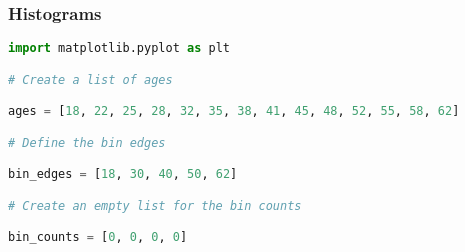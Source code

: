 \documentclass{beamer}
\begin{document}
    \begin{frame}[fragile]
    \frametitle{Histograms}
    \begin{lstlisting}[language=Python]
import matplotlib.pyplot as plt

# Create a list of ages

ages = [18, 22, 25, 28, 32, 35, 38, 41, 45, 48, 52, 55, 58, 62]

# Define the bin edges

bin_edges = [18, 30, 40, 50, 62]

# Create an empty list for the bin counts

bin_counts = [0, 0, 0, 0]
    \end{lstlisting}
    \end{frame}
\end{document}
